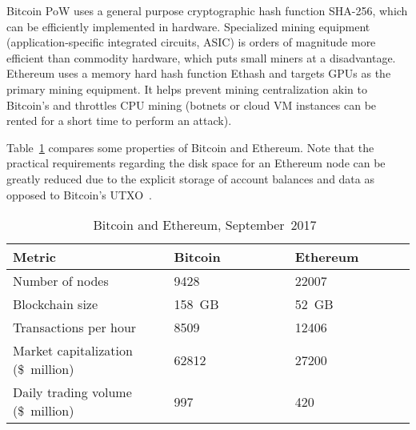 Bitcoin PoW uses a general purpose cryptographic hash function SHA-256, which can be efficiently implemented in hardware.
Specialized mining equipment (application-specific integrated circuits, ASIC) is orders of magnitude more efficient than commodity hardware, which puts small miners at a disadvantage.
Ethereum uses a memory hard hash function Ethash and targets GPUs as the primary mining equipment.
It helps prevent mining centralization akin to Bitcoin's and throttles CPU mining (botnets or cloud VM instances can be rented for a short time to perform an attack).

Table~\ref{table:1} compares some properties of Bitcoin and Ethereum.
Note that the practical requirements regarding the disk space for an Ethereum node can be greatly reduced due to the explicit storage of account balances and data as opposed to Bitcoin's UTXO~\cite{EthereumSEDiskSpace}.

\begin{table}[ht]
	\centering
	\begin{tabular}{|p{0.40\linewidth}|p{0.30\linewidth}|p{0.30\linewidth}|}
		\hline
		\textbf{Metric} & \textbf{Bitcoin} & \textbf{Ethereum} \\
		\hline\hline
		Number of nodes & 9428 & 22007 \\
		\hline
		Blockchain size & 158~GB & 52~GB \\
		\hline
		Transactions per hour & 8509 & 12406 \\ 
		\hline
		Market capitalization (\$~million) & 62812 & 27200 \\
		\hline
		Daily trading volume (\$~million) & 997 & 420 \\
		\hline
	\end{tabular}
	\caption{Bitcoin and Ethereum, September~2017~\cite{Etherchain17, Bitnodes17, Ethernodes17, Bitinfocharts17, Coinmarketcap17}}
	\label{table:1}
\end{table}

